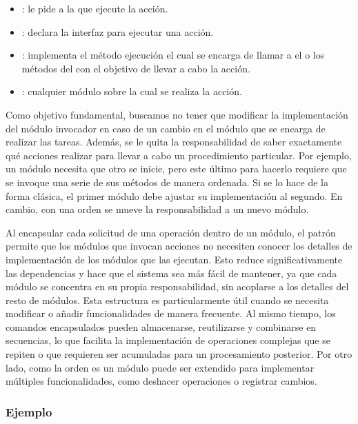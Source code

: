 \begin{itemize}
    \item \Invocador: le pide a la \Orden que ejecute la acción.
    \item \Orden: declara la interfaz para ejecutar una acción.
    \item \OrdenConcreta: implementa el método ejecución el cual se encarga de llamar a el o los métodos del \Receptor con el objetivo de llevar a cabo la acción.
    \item \Receptor: cualquier módulo sobre la cual se realiza la acción.
\end{itemize}

Como objetivo fundamental, buscamos no tener que modificar la implementación del módulo invocador en caso de un cambio en el módulo que se encarga de realizar las tareas. Además, se le quita la responsabilidad de saber exactamente qué acciones realizar para llevar a cabo un procedimiento particular. Por ejemplo, un módulo necesita que otro se inicie, pero este último para hacerlo requiere que se invoque una serie de sus métodos de manera ordenada. Si se lo hace de la forma clásica, el primer módulo debe ajustar su implementación al segundo. En cambio, con una orden se mueve la responsabilidad a un nuevo módulo.

Al encapsular cada solicitud de una operación dentro de un módulo, el patrón permite que los módulos que invocan acciones no necesiten conocer los detalles de implementación de los módulos que las ejecutan. Esto reduce significativamente las dependencias y hace que el sistema sea más fácil de mantener, ya que cada módulo se concentra en su propia responsabilidad, sin acoplarse a los detalles del resto de módulos. Esta estructura es particularmente útil cuando se necesita modificar o añadir funcionalidades de manera frecuente. Al mismo tiempo, los comandos encapsulados pueden almacenarse, reutilizarse y combinarse en secuencias, lo que facilita la implementación de operaciones complejas que se repiten o que requieren ser acumuladas para un procesamiento posterior. Por otro lado, como la orden es un módulo puede ser extendido para implementar múltiples funcionalidades, como deshacer operaciones o registrar cambios. 

\subsubsection{Ejemplo}


